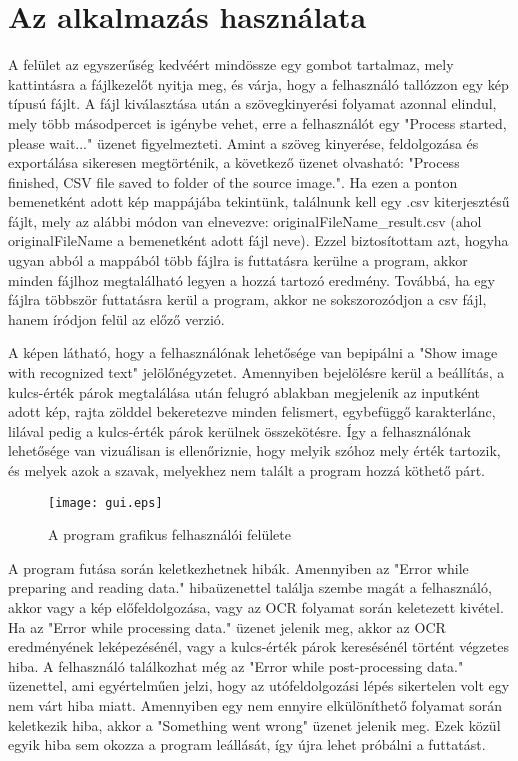 \documentclass[12pt]{report}
\begin{document}
\section{Az alkalmazás használata}
A felület az egyszerűség kedvéért mindössze egy gombot tartalmaz, mely kattintásra a fájlkezelőt nyitja meg, és várja, hogy a felhasználó tallózzon egy kép típusú fájlt. A fájl kiválasztása után a szövegkinyerési folyamat azonnal elindul, mely több másodpercet is igénybe vehet, erre a felhasználót egy "Process started, please wait..." üzenet figyelmezteti. Amint a szöveg kinyerése, feldolgozása és exportálása sikeresen megtörténik, a következő üzenet olvasható: "Process finished, CSV file saved to folder of the source image.".
Ha ezen a ponton bemenetként adott kép mappájába tekintünk, találnunk kell egy .csv kiterjesztésű fájlt, mely az alábbi módon van elnevezve: originalFileName\_result.csv (ahol originalFileName a bemenetként adott fájl neve). Ezzel biztosítottam azt, hogyha ugyan abból a mappából több fájlra is futtatásra kerülne a program, akkor minden fájlhoz megtalálható legyen a hozzá tartozó eredmény. Továbbá, ha egy fájlra többször futtatásra kerül a program, akkor ne sokszorozódjon a csv fájl, hanem íródjon felül az előző verzió.

A képen látható, hogy a felhasználónak lehetősége van bepipálni a "Show image with recognized text" jelölőnégyzetet. Amennyiben bejelölésre kerül a beállítás, a kulcs-érték párok megtalálása után felugró ablakban megjelenik az inputként adott kép, rajta zölddel bekeretezve minden felismert, egybefüggő karakterlánc, lilával pedig a kulcs-érték párok kerülnek összekötésre.
Így a felhasználónak lehetősége van vizuálisan is ellenőriznie, hogy melyik szóhoz mely érték tartozik, és melyek azok a szavak, melyekhez nem talált a program hozzá köthető párt.

\begin{figure}[h]
    \centerline{\texttt{[image: gui.eps]}}
    \caption{A program grafikus felhasználói felülete}
\end{figure}

A program futása során keletkezhetnek hibák. Amennyiben az "Error while preparing and reading data." hibaüzenettel találja szembe magát a felhasználó, akkor vagy a kép előfeldolgozása, vagy az OCR folyamat során keletezett kivétel. Ha az "Error while processing data." üzenet jelenik meg, akkor az OCR eredményének leképezésénél, vagy a kulcs-érték párok keresésénél történt végzetes hiba.
A felhasználó találkozhat még az "Error while post-processing data." üzenettel, ami egyértelműen jelzi, hogy az utófeldolgozási lépés sikertelen volt egy nem várt hiba miatt. Amennyiben egy nem ennyire elkülöníthető folyamat során keletkezik hiba, akkor a "Something went wrong" üzenet jelenik meg. Ezek közül egyik hiba sem okozza a program leállását, így újra lehet próbálni a futtatást.
\end{document}

